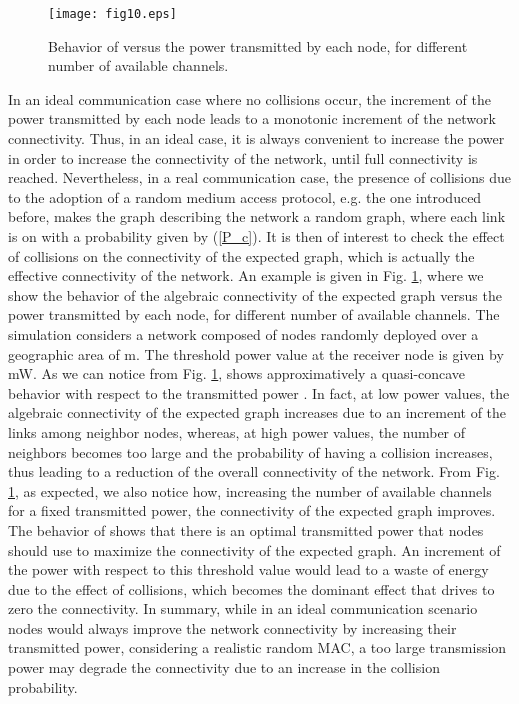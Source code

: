 \documentclass[10pt,twocolumn]{IEEEtran}
\begin{document}
\begin{figure}[t]
\centering
\texttt{[image: fig10.eps]}
  \caption{Behavior of  versus the power transmitted by each node, for different number  of available channels.}\label{mean_lambda_power}
\end{figure}
In an ideal communication case where no collisions occur, the increment of the power transmitted by each node leads to a monotonic increment of the network connectivity.
Thus, in an ideal case, it is always convenient to increase the power in order to increase the connectivity of the network, until full connectivity is reached. Nevertheless, in a real communication case, the presence of collisions due to the adoption of a random medium access protocol, e.g. the one introduced before, makes the graph describing the network a random graph, where each link is on with a probability given by (\ref{P_c}). It is then of interest to check the effect of collisions on the connectivity of the expected graph, which is actually the effective connectivity of the network. An example is given in Fig. \ref{mean_lambda_power}, where we show the behavior of the algebraic connectivity of the expected graph  versus the power transmitted by each node, for different number  of available channels. The simulation considers a network composed of  nodes randomly deployed over a geographic area of  m. The threshold power value at the receiver node is given by  mW.
As we can notice from Fig. \ref{mean_lambda_power},  shows approximatively a quasi-concave behavior with respect to the transmitted power . In fact, at low power values, the algebraic connectivity of the expected graph increases due to an increment of the links among neighbor nodes, whereas, at high power values, the number of neighbors becomes too large and the probability of having a collision increases, thus leading to a reduction of the overall connectivity of the network. From Fig. \ref{mean_lambda_power}, as expected, we also notice how, increasing the number of available channels  for a fixed transmitted power, the connectivity of the expected graph improves. The behavior of  shows that there is an optimal transmitted power that nodes should use to maximize the connectivity of the expected graph. An increment of the power with respect to this threshold value would lead to a waste of energy due to the effect of collisions, which becomes the dominant effect that drives to zero the connectivity. In summary, while in an ideal communication scenario nodes would always improve the network connectivity by increasing their transmitted power, considering a realistic random MAC, a too large transmission power may degrade the connectivity due to an increase in the collision probability.
\end{document}
